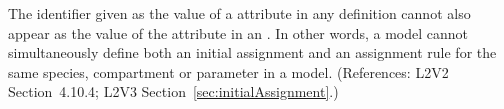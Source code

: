 The identifier given as the value of a 
attribute in any \InitialAssignment definition cannot also appear
as the value of the  attribute in an
\AssignmentRule.  In other words, a model cannot
simultaneously define both an initial assignment and an assignment rule for
the same species, compartment or parameter in a model.
(References: L2V2 Section~4.10.4; L2V3
Section~\ref{sec:initialAssignment}.)
